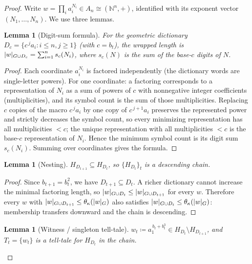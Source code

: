 \documentclass[11pt]{article}
\numberwithin{equation}{section}
\newcommand{\N}{\mathbb{N}}
\newcommand{\defeq}{\coloneqq}
\DeclarePairedDelimiter{\abs}{\lvert}{\rvert}
\newcommand{\Comp}[1]{H_{#1}}
\theoremstyle{plain}
\newtheorem{lemma}[theorem]{Lemma}
\theoremstyle{definition}
\theoremstyle{remark}
\begin{document}
\begin{statementbox}
\ThmAbelian*
\end{statementbox}
\begin{proof}
Write $w = \prod_i a_i^{N_i} \in A_n \cong (\N^n, +)$, identified with its exponent vector
$(N_1, \dots, N_n)$. We use three lemmas.

\begin{lemma}[Digit-sum formula]\label{lem:digitsum}
For the geometric dictionary $D_c = \{ c^{\,j} a_i : i \le n, j \ge 1 \}$ (with $c = b_t$),
the wrapped length is $\abs{w}_{G \cup D_c} = \sum_{i=1}^n s_c(N_i)$, where $s_c(N)$ is the
sum of the base-$c$ digits of $N$.
\end{lemma}

\begin{proof}
Each coordinate $a_i^{N_i}$ is factored independently (the dictionary words are single-letter
powers). For one coordinate: a factoring corresponds to a representation of $N_i$ as a sum of
powers of $c$ with nonnegative integer coefficients (multiplicities), and its symbol count is
the sum of those multiplicities. Replacing $c$ copies of the macro $c^{\,j} a_i$ by one copy
of $c^{\,j+1} a_i$ preserves the represented power and strictly decreases the symbol count, so
every minimizing representation has all multiplicities $< c$; the unique representation with
all multiplicities $< c$ is the base-$c$ representation of $N_i$. Hence the minimum symbol
count is its digit sum $s_c(N_i)$. Summing over coordinates gives the formula.
\end{proof}

\begin{lemma}[Nesting]\label{lem:nesting}
$\Comp{D_{t+1}} \subseteq \Comp{D_t}$, so $\{\Comp{D_t}\}_t$ is a descending chain.
\end{lemma}

\begin{proof}
Since $b_{t+1} = b_t^2$, we have $D_{t+1} \subseteq D_t$. A richer dictionary cannot increase
the minimal factoring length, so $\abs{w}_{G \cup D_t} \le \abs{w}_{G \cup D_{t+1}}$ for every
$w$. Therefore every $w$ with $\abs{w}_{G \cup D_{t+1}} \le \theta_\kappa(\abs{w}_G)$ also
satisfies $\abs{w}_{G \cup D_t} \le \theta_\kappa(\abs{w}_G)$: membership transfers downward
and the chain is descending.
\end{proof}

\begin{lemma}[Witness / singleton tell-tale]\label{lem:witness}
$w_t \defeq a_1^{\,b_t + b_t^3} \in \Comp{D_t} \setminus \Comp{D_{t+1}}$, and $T_t = \{w_t\}$
is a tell-tale for $\Comp{D_t}$ in the chain.
\end{lemma}


\end{proof}
\end{document}
